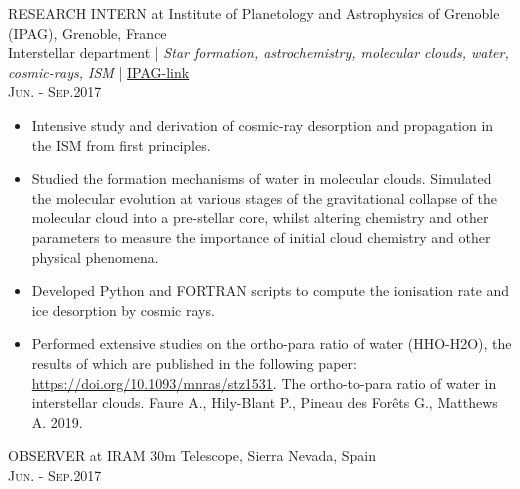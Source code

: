 \documentclass[a4paper,10pt]{article}
\begin{document}
RESEARCH INTERN at Institute of Planetology and Astrophysics of Grenoble (IPAG), Grenoble, France\\
Interstellar department | \small\emph{Star formation, astrochemistry, molecular clouds, water, cosmic-rays, ISM} |  \href{http://ipag.osug.fr/recherche/equipes/astrophysique-moleculaire/?lang=fr}{IPAG-link}\\
\textsc{Jun. - Sep.}\textsc{2017}

\begin{itemize}[leftmargin=*,topsep=0pt,noitemsep,parsep=0pt,partopsep=0pt,rightmargin=0.2cm]
\setlength\itemsep{0em}

 \item Intensive study and derivation of cosmic-ray desorption and propagation in the ISM from first principles. 
 
 \item Studied the formation mechanisms of water in molecular clouds. Simulated the molecular evolution at various stages of the gravitational collapse of the molecular cloud into a pre-stellar core, whilst altering chemistry and other parameters to measure the importance of initial cloud chemistry and other physical phenomena.
 
 \item Developed Python and FORTRAN scripts to compute the ionisation rate and ice desorption by cosmic rays. 
 
 \item Performed extensive studies on the ortho-para ratio of water (HHO-H2O), the results of which are published in the following paper: \url{https://doi.org/10.1093/mnras/stz1531}. The ortho-to-para ratio of water in interstellar clouds. Faure A., Hily-Blant P., Pineau des Forêts G., Matthews A. 2019.
\end{itemize}

OBSERVER at IRAM 30m Telescope, Sierra Nevada, Spain\\
\textsc{Jun. - Sep.}\textsc{2017}
\end{document}
